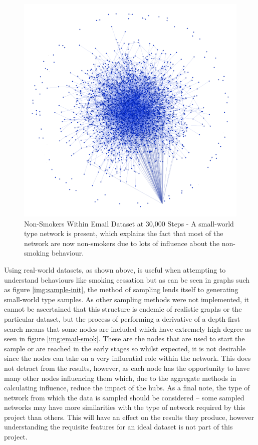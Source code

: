 \documentclass[]{report}
\begin{document}
\begin{figure}
\begin{center}
\includegraphics[scale=0.4]{email-nonsmok.png}
\end{center}
\caption{Non-Smokers Within Email Dataset at 30,000 Steps - A small-world type network is present, which explains the fact that most of the network are now non-smokers due to lots of influence about the non-smoking behaviour.}
\label{img:email-nonsmok}
\end{figure}

Using real-world datasets, as shown above, is useful when attempting to understand behaviours like smoking cessation but as can be seen in graphs such as figure \ref{img:sample-init}, the method of sampling lends itself to generating small-world type samples. As other sampling methods were not implemented, it cannot be ascertained that this structure is endemic of realistic graphs or the particular dataset, but the process of performing a derivative of a depth-first search means that some nodes are included which have extremely high degree as seen in figure \ref{img:email-smok}. These are the nodes that are used to start the sample or are reached in the early stages so whilst expected, it is not desirable since the nodes can take on a very influential role within the network. This does not detract from the results, however, as each node has the opportunity to have many other nodes influencing them which, due to the aggregate methods in calculating influence, reduce the impact of the hubs. As a final note, the type of network from which the data is sampled should be considered – some sampled networks may have more similarities with the type of network required by this project than others. This will have an effect on the results they produce, however understanding the requisite features for an ideal dataset is not part of this project.
\end{document}
